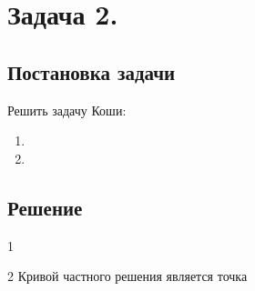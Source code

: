 

\section{Задача 2.}
\subsection{Постановка задачи}

Решить задачу Коши:

\begin{enumerate}                                            
	\item
		\customCases
			{\equationFirst}
			{\conditionFirst}
	\item
		\customCases
			{\equationSecond}
			{\conditionSecond}
\end{enumerate}

\newpage

\subsection{Решение}
\begin{enumerate}
	\taskTwoSolutionItem
		{\equationFirst}
		{\solutionFirst}
		{\conditionFirst}
		{\constantFirst}
		{\solutionFirst[\constantFirst]}
		{1}

	\newpage

	\taskTwoSolutionItem
		{\equationSecond}
		{\solutionSecond}
		{\conditionSecond}
		{\constantSecond}
		{\solutionSecond[{}]}
		{2}
		\centering Кривой частного решения является точка
	
\end{enumerate}
